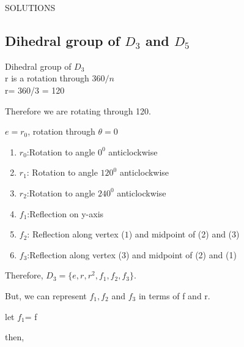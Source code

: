\documentclass{article}
\begin{document}
\large{SOLUTIONS}
\subsection{Dihedral group of $D_3$ and $D_5$}
\Large{Dihedral group of  $D_3$}\\
r is a rotation through $360/n$\\
r= 360/3 = 120

Therefore we are rotating through 120.

$e=r_0$, rotation through $\theta=0$

\begin{enumerate}

\item{$r_0$:Rotation to angle $0^0$ anticlockwise }



\item{$r_1$: Rotation to angle $120^0$ anticlockwise }

\vspace{7cm}
\item{$r_2$:Rotation to angle $240^0$ anticlockwise }


\item{$f_1$:Reflection on y-axis }


\item{$f_2$: Reflection along vertex ($1$) and midpoint of  (2) and (3)}

\vspace{4cm}
\item{$f_3$:Reflection along vertex ($3$) and midpoint of  (2) and (1)}

\end{enumerate}
Therefore, $D_3=\{e,r,r^2,f_1,f_2,f_3\}$.

But, we can represent $f_1,f_2$ and $f_3$ in terms of f and r.

let $f_1$= f

then,

\newcommand{\NewOne}[3]{
\begin{tikzpicture}
\draw [color=black](-2,0) -- (2,0);
\draw [color=black](0,-1.7) -- (0,3);
    \node[regular polygon,
    draw,minimum size=2cm,
    right color=white,left color=white,
    regular polygon sides = 3] (p) at (0,0.5){};
   \labelForthree{#1}{#2}{#3}
\end{tikzpicture}}
\newcommand{\arrowP}[1]{
\begin{tikzpicture}
    \draw [color=white](0,-3) -- (0,3);
    \draw [color=white](-0.4,0) -- (0.4,0);
    \draw[ultra thick, ->](-0.4,0) -- (0.4,0);
    \node at (0,0.3) {$#1$};
\end{tikzpicture}}
\end{document}
